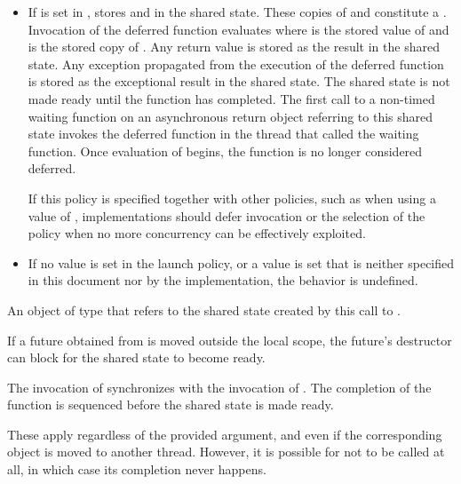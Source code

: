 \begin{itemdescr}
\begin{itemize}
\item
If  is set in ,
stores  and
in the shared state. These copies of  and  constitute
a . Invocation of the deferred function evaluates
 where  is the stored value of
 and  is the stored copy of
.
Any return value is stored
as the result in the shared state.
Any exception propagated
from the execution
of the deferred function
is stored as the exceptional result
in the shared state.
The shared state is not
made ready until the function has completed. The first call to a
non-timed waiting function
on an asynchronous return object referring to
this shared state invokes the
deferred function in the thread that called the waiting function.
Once evaluation of  begins, the function is no longer
considered deferred.

\recommended
If this policy is specified together with other policies, such as when using a
 value of , implementations should defer
invocation or the selection of the policy when no more concurrency can be effectively
exploited.

\item
If no value is set in the launch policy, or a value is set that is neither specified
in this document nor by the implementation, the behavior is undefined.
\end{itemize}

\pnum
\returns
An object of type
 that refers
to the shared state created by this call to .
\begin{note}
If a future obtained from  is moved outside the local scope,
the future's destructor can block for the shared state to become ready.
\end{note}

\pnum
\sync
The invocation of  synchronizes with the invocation of .
The completion of the function  is sequenced before
the shared state is made ready.
\begin{note}
These apply regardless of the provided  argument, and
even if the corresponding  object is moved to another thread.
However, it is possible for  not to be called at all,
in which case its completion never happens.
\end{note}


\end{itemdescr}
